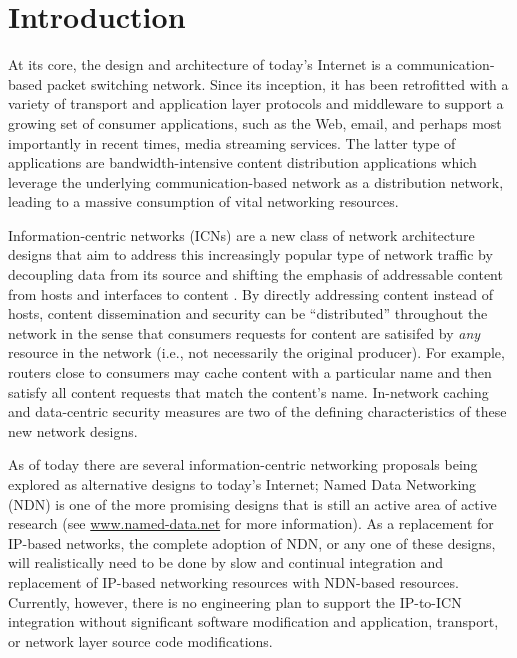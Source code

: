 \section{Introduction}
At its core, the design and architecture of today's Internet is a communication-based packet switching network. Since its inception, it has been retrofitted with a variety of transport and application layer protocols and middleware to support a growing set of consumer applications, such as the Web, email, and perhaps most importantly in recent times, media streaming services. The latter type of applications are bandwidth-intensive content distribution applications which leverage the underlying communication-based network as a distribution network, leading to a massive consumption of vital networking resources. 

Information-centric networks (ICNs) are a new class of network architecture designs that aim to address this increasingly popular type of network traffic by decoupling data from its source and shifting the emphasis of addressable content from hosts and interfaces to content \cite{first}. By directly addressing content instead of hosts, content dissemination and security can be ``distributed'' throughout the network in the sense that consumers requests for content are satisifed by \emph{any} resource in the network (i.e., not necessarily the original producer). For example, routers close to consumers may cache content with a particular name and then satisfy all content requests that match the content's name. In-network caching and data-centric security measures are two of the defining characteristics of these new network designs. 

As of today there are several information-centric networking proposals being explored as alternative designs to today's Internet; Named Data Networking (NDN) \cite{ndn-techreport} is one of the more promising designs that is still an active area of active research (see \url{www.named-data.net} for more information). As a replacement for IP-based networks, the complete adoption of NDN, or any one of these designs, will realistically need to be done by slow and continual integration and replacement of IP-based networking resources with NDN-based resources. Currently, however, there is no engineering plan to support the IP-to-ICN integration without significant software modification and application, transport, or network layer source code modifications.

